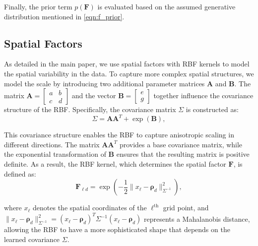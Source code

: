 Finally, the prior term $p(\mathbf{F})$ is evaluated based on the assumed generative distribution mentioned in \eqref{eqn:f_prior}.

\subsection{Spatial Factors}

As detailed in the main paper, we use spatial factors with RBF kernels to model the spatial variability in the data.  To capture more complex spatial structures, we model the scale by introducing two additional parameter matrices $\mathbf{A}$ and $\mathbf{B}$. The matrix $\mathbf{A} = \begin{bmatrix} a & b \\ c & d \end{bmatrix}$ and the vector $\mathbf{B} = \begin{bmatrix} e \\ g \end{bmatrix}$ together influence the covariance structure of the RBF. Specifically, the covariance matrix $\Sigma$ is constructed as:
\begin{equation}
    \Sigma = \mathbf{A} \mathbf{A}^T + \exp(\mathbf{B}),
\end{equation}


This covariance structure enables the RBF to capture anisotropic scaling in different directions. The matrix $\mathbf{A} \mathbf{A}^T$ provides a base covariance matrix, while the exponential transformation of $\mathbf{B}$ ensures that the resulting matrix is positive definite. As a result, the RBF kernel, which determines the spatial factor $\mathbf{F}$, is defined as:
\begin{equation}
    \mathbf{F}_{\ell d} = \exp\left( -\frac{1}{2} \| x_\ell - \boldsymbol{\rho}_d \|^2_{\Sigma^{-1}} \right),
\end{equation}


where $x_\ell$ denotes the spatial coordinates of the $\ell^\text{th}$ grid point, and $\| x_\ell - \boldsymbol{\rho}_d \|^2_{\Sigma^{-1}} = (x_\ell - \boldsymbol{\rho}_d)^T \Sigma^{-1} (x_\ell - \boldsymbol{\rho}_d)$ represents a Mahalanobis distance, allowing the RBF to have a more sophisticated shape that depends on the learned covariance $\Sigma$.

